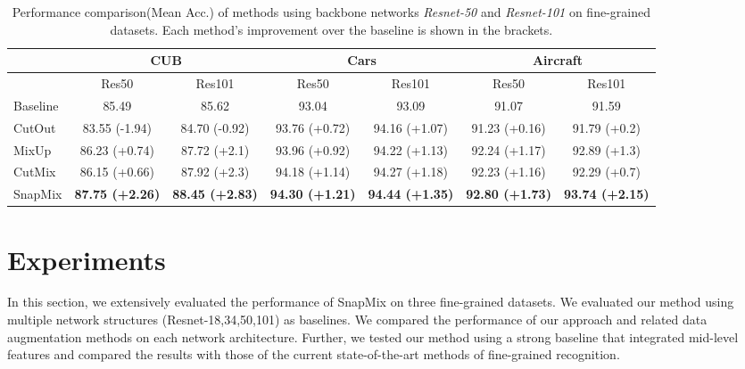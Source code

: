 \documentclass[letterpaper]{article} \usepackage{aaai21}  \usepackage{times}  \usepackage{helvet} \usepackage{courier}  \usepackage[hyphens]{url}  \usepackage{graphicx} \urlstyle{rm} \def\UrlFont{\rm}  \usepackage{natbib}  \usepackage{caption} \frenchspacing  \setlength{\pdfpagewidth}{8.5in}  \setlength{\pdfpageheight}{11in}
\begin{document}
    \begin{table*}
\caption{Performance comparison(Mean Acc.) of methods using backbone networks \textit{Resnet-50} and \textit{Resnet-101} on fine-grained datasets. Each method's improvement over the baseline is shown in the brackets.}
        \begin{center}
            \begin{tabular}{lcc|cc|cc}
\toprule
            & \multicolumn{2}{c}{CUB} & \multicolumn{2}{c}{Cars} & \multicolumn{2}{c}{Aircraft} \\
            \midrule
            & Res50 & Res101  & Res50 & Res101& Res50 & Res101 \\
Baseline & 85.49 & 85.62 & 93.04 & 93.09 & 91.07 & 91.59 \\
            \hline
             CutOut              & 83.55 (-1.94) & 84.70 (-0.92) & 93.76 (+0.72) & 94.16 (+1.07) & 91.23 (+0.16) & 91.79 (+0.2)\\
             MixUp                & 86.23 (+0.74) & 87.72 (+2.1) & 93.96 (+0.92) & 94.22 (+1.13) & 92.24 (+1.17) & 92.89 (+1.3)\\
            CutMix             & 86.15 (+0.66) & 87.92 (+2.3) & 94.18 (+1.14) & 94.27 (+1.18) & 92.23 (+1.16) & 92.29 (+0.7)\\
             \hline
             SnapMix             & \textbf{87.75 (+2.26)}& \textbf{88.45 (+2.83)} & \textbf{94.30 (+1.21)} & \textbf{94.44 (+1.35)}& \textbf{92.80 (+1.73)} & \textbf{93.74 (+2.15)}\\
            \bottomrule
            \end{tabular}
\end{center}
        \label{table:augmentation}
\end{table*}




\section{Experiments}

In this section, we extensively evaluated the performance of SnapMix on three fine-grained datasets. We evaluated our method using multiple network structures  (Resnet-18,34,50,101) as baselines. We compared the performance of our approach and related data augmentation methods on each network architecture. Further, we tested our method using a strong baseline that integrated mid-level features and compared the results with those of the current state-of-the-art methods of fine-grained recognition.
\end{document}
